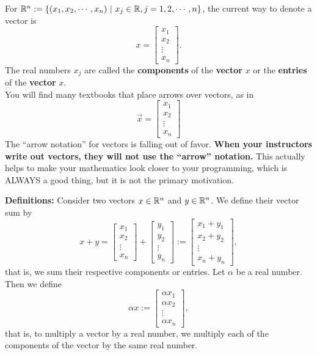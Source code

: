 \vspace*{0.5cm}

\begin{tcolorbox}[title=\textbf{\Large Some Books use Different Notation for Vectors in $\real^n$}]
 For $\mathbb R^n:=\{(x_1, x_2, \cdots, x_n)~|~ x_j \in \mathbb R, j=1, 2, \cdots, n  \}$, the current way to denote a vector is
$$x = \begin{bmatrix} x_1 \\ x_2 \\ \vdots \\ x_n\end{bmatrix}. $$
The real numbers $x_j$ are called the \textbf{components} of the \textbf{vector} $x$ or the \textbf{entries} of the \textbf{vector} $x$.\\

 You will find many textbooks that place arrows over vectors, as in $$\vec{x} = \begin{bmatrix} x_1 \\ x_2 \\ \vdots \\ x_n\end{bmatrix} $$
The ``arrow notation'' for vectors is falling  out of favor. \textbf{When your instructors write out vectors, they will not use the ``arrow'' notation.} This actually helps to make your mathematics look closer to your programming, which is ALWAYS a good thing, but it is not the primary motivation.
\end{tcolorbox}




\vspace*{0.5 cm}

\textbf{Definitions:} Consider two vectors $x\in \mathbb R^n$ and $y\in \mathbb R^n$. We define their vector sum by 
$$x+y=\begin{bmatrix} x_1 \\ x_2 \\ \vdots \\ x_n\end{bmatrix}+  \begin{bmatrix} y_1 \\ y_2 \\ \vdots \\ y_n\end{bmatrix}:=\begin{bmatrix} x_1 + y_1 \\ x_2 + y_2 \\ \vdots \\ x_n + y_n\end{bmatrix},$$
that is, we sum their respective components or entries. 
Let $\alpha$ be a real number. Then we define 
$$\alpha x := \begin{bmatrix} \alpha x_1 \\ \alpha x_2 \\ \vdots \\\alpha x_n\end{bmatrix}, $$
that is, to multiply a vector by a real number, we multiply each of the components of the vector by the same real number. \Qed \\

